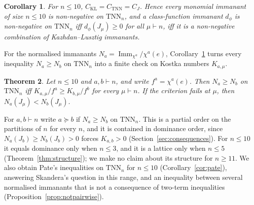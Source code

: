 \documentclass[11pt]{amsart}
\newtheorem{theorem}{Theorem}[section]
\newtheorem{corollary}[theorem]{Corollary}
\theoremstyle{definition}
\theoremstyle{remark}
\newcommand{\Imm}{\operatorname{Imm}}
\newcommand{\TNN}{\mathrm{TNN}}
\newcommand{\CKL}{C_{\mathrm{KL}}}
\newcommand{\CTNN}{C_{\mathrm{TNN}}}
\newcommand{\CJ}{C_{J}}
\begin{document}
\begin{corollary}\label{cor:cones}
For $n\le10$, $\CKL=\CTNN=\CJ$. Hence every monomial immanant of size $n\le10$ is non-negative on $\TNN_n$, and a class-function immanant $d_\phi$ is non-negative on $\TNN_n$ iff $d_\phi(J_\mu)\ge0$ for all $\mu\vdash n$, iff it is a non-negative combination of Kazhdan--Lusztig immanants.
\end{corollary}

For the normalised immanants $N_a=\Imm_{\chi^a}/\chi^a(e)$, Corollary~\ref{cor:cones} turns every inequality $N_a\ge N_b$ on $\TNN_n$ into a finite check on Kostka numbers $K_{a,\mu}$.

\begin{theorem}\label{thm:order}
Let $n\le10$ and $a,b\vdash n$, and write $f^a=\chi^a(e)$. Then $N_a\ge N_b$ on $\TNN_n$ iff $K_{a,\mu}/f^a\ge K_{b,\mu}/f^b$ for every $\mu\vdash n$. If the criterion fails at $\mu$, then $N_a(J_\mu)<N_b(J_\mu)$.
\end{theorem}

For $a,b\vdash n$ write $a\succeq b$ if $N_a\ge N_b$ on $\TNN_n$. This is a partial order on the partitions of $n$ for every $n$, and it is contained in dominance order, since $N_a(J_b)\ge N_b(J_b)>0$ forces $K_{a,b}>0$ (Section~\ref{sec:consequences}). For $n\le10$ it equals dominance only when $n\le3$, and it is a lattice only when $n\le5$ (Theorem~\ref{thm:structure}); we make no claim about its structure for $n\ge11$. We also obtain Pate's inequalities on $\TNN_n$ for $n\le10$ (Corollary~\ref{cor:pate}), answering Skandera's question \cite[Problem~29]{Ska25} in this range, and an inequality between several normalised immanants that is not a consequence of two-term inequalities (Proposition~\ref{prop:notpairwise}).
\end{document}
